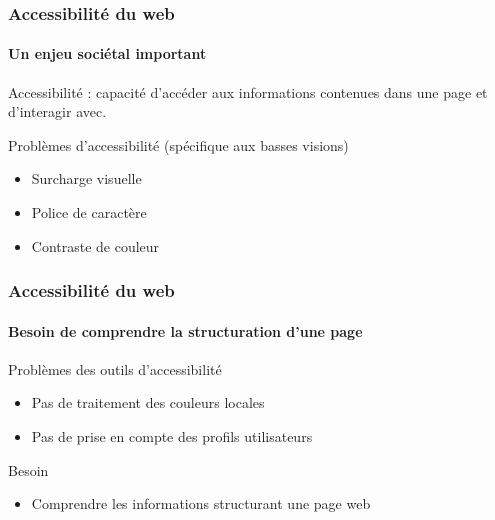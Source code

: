 \documentclass[9pt]{beamer}
\begin{document}
\begin{frame}
	\frametitle{Accessibilité du web}
	\framesubtitle{Un enjeu sociétal important}
	\begin{definition}{Accessibilité : }
	capacité d'accéder aux informations contenues dans une page et d'interagir avec.
	\end{definition}
	\begin{block}{Problèmes d'accessibilité (spécifique aux basses visions)}
		\begin{itemize}
			\item Surcharge visuelle
			\item Police de caractère
			\item Contraste de couleur
		\end{itemize}
	\end{block}
\end{frame}

\begin{frame}
\frametitle{Accessibilité du web}
\framesubtitle{Besoin de comprendre la structuration d'une page}
	\begin{block}{Problèmes des outils d'accessibilité}
	\begin{itemize}
		\item Pas de traitement des couleurs locales
		\item Pas de prise en compte des profils utilisateurs
	\end{itemize}
	\end{block}
	\begin{block}{Besoin}
	\begin{itemize}
		\item Comprendre les informations structurant une page web
	\end{itemize}
	\end{block}
\end{frame}
\end{document}

